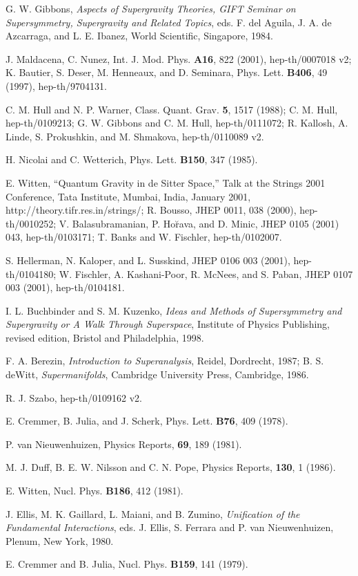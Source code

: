 \documentclass[a4paper,12pt]{article}
\begin{document}
\begin{thebibliography}{100}
 G. W. Gibbons, {\it Aspects of Supergravity
Theories, GIFT Seminar on Supersymmetry, Supergravity and Related
Topics}, eds. F. del Aguila, J. A. de Azcarraga, and L. E.
Ibanez, World Scientific, Singapore, 1984.

 J. Maldacena, C. Nunez, Int. J. Mod. Phys. {\bf A16},
822 (2001), hep-th/0007018 v2; K. Bautier, S. Deser, M. Henneaux, and D.
Seminara, Phys. Lett. {\bf B406}, 49 (1997), hep-th/9704131.

 C. M. Hull and N. P. Warner, Class. Quant. Grav.
{\bf 5}, 1517 (1988); C. M. Hull, hep-th/0109213; G. W. Gibbons
and C. M. Hull, hep-th/0111072; R. Kallosh, A. Linde, S.
Prokushkin, and M. Shmakova, hep-th/0110089 v2.

 H. Nicolai and C. Wetterich, Phys. Lett. {\bf
B150}, 347 (1985).

 E. Witten, ``Quantum Gravity in de Sitter
Space,'' Talk at the Strings 2001 Conference, Tata Institute,
Mumbai, India, January 2001, http://theory.tifr.res.in/strings/;
R. Bousso, JHEP 0011, 038 (2000), hep-th/0010252; V.
Balasubramanian, P. Ho\u{r}ava, and D. Minic, JHEP 0105 (2001) 043,
hep-th/0103171; T. Banks and W. Fischler, hep-th/0102007.

 S. Hellerman, N. Kaloper, and L. Susskind,
JHEP 0106 003 (2001), hep-th/0104180; W. Fischler, A.
Kashani-Poor, R. McNees, and S. Paban, JHEP
0107 003 (2001), hep-th/0104181.

 I. L. Buchbinder and S. M. Kuzenko, {\it
Ideas and Methods of Supersymmetry and Supergravity or A Walk
Through Superspace}, Institute of Physics
Publishing, revised edition, Bristol and Philadelphia, 1998.

 F. A. Berezin, {\it Introduction to
Superanalysis}, Reidel, Dordrecht, 1987; B. S. deWitt, {\it
Supermanifolds}, Cambridge University Press, Cambridge, 1986.

 R. J. Szabo, hep-th/0109162 v2.

 E. Cremmer, B. Julia, and J. Scherk, Phys. Lett.
{\bf B76}, 409 (1978).

 P. van Nieuwenhuizen, Physics Reports,
{\bf 69}, 189 (1981).

 M. J. Duff, B. E. W. Nilsson and C. N. Pope,
Physics Reports, {\bf 130}, 1 (1986).

 E. Witten, Nucl. Phys. {\bf B186}, 412 (1981).

 J. Ellis, M. K. Gaillard, L. Maiani, and B.
Zumino, {\it Unification of the Fundamental Interactions}, eds.
J. Ellis, S. Ferrara and P. van Nieuwenhuizen, Plenum, New York,
1980.

 E. Cremmer and B. Julia, Nucl. Phys. {\bf
B159}, 141 (1979).

\end{thebibliography}
\end{document}
